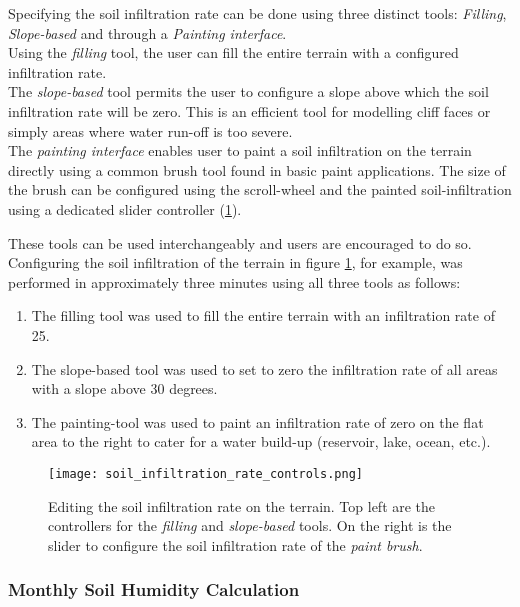 Specifying the soil infiltration rate can be done using three distinct tools: \textit{Filling}, \textit{Slope-based} and through a \textit{Painting interface}.\\
Using the \textit{filling} tool, the user can fill the entire terrain with a configured infiltration rate.\\
The \textit{slope-based} tool permits the user to configure a slope above which the soil infiltration rate will be zero. This is an efficient tool for modelling cliff faces or simply areas where water run-off is too severe.\\
The \textit{painting interface} enables user to paint a soil infiltration on the terrain directly using a common brush tool found in basic paint applications. The size of the brush can be configured using the scroll-wheel and the painted soil-infiltration using a dedicated slider controller (\ref{fig:soil_infiltration_controls}).

These tools can be used interchangeably and users are encouraged to do so. Configuring the soil infiltration of the terrain in figure \ref{fig:soil_infiltration_controls}, for example, was performed in approximately three minutes using all three tools as follows:
\begin{enumerate}
\item The filling tool was used to fill the entire terrain with an infiltration rate of 25.\\
\item The slope-based tool was used to set to zero the infiltration rate of all areas with a slope above 30 degrees.\\
\item The painting-tool was used to paint an infiltration rate of zero on the flat area to the right to cater for a water build-up (reservoir, lake, ocean, etc.).\\
\end{enumerate}

\begin{figure}
\center
	\texttt{[image: soil\_infiltration\_rate\_controls.png]}
	\caption{ Editing the soil infiltration rate on the terrain. Top left are the controllers for the \textit{filling} and \textit{slope-based} tools. On the right is the slider to configure the soil infiltration rate of the \textit{paint brush}. }
	\label{fig:soil_infiltration_controls}
\end{figure}

\subsubsection{Monthly Soil Humidity Calculation}

